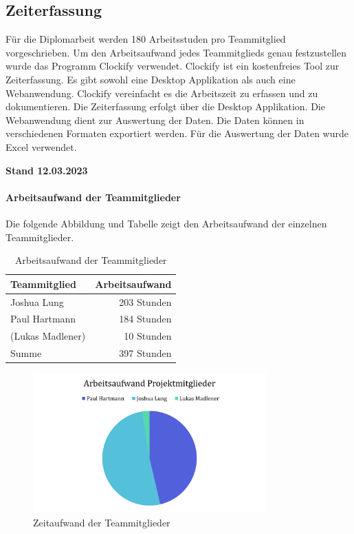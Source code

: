 \subsection{Zeiterfassung}
Für die Diplomarbeit werden 180 Arbeitsstuden pro Teammitglied vorgeschrieben. Um den Arbeitsaufwand jedes Teammitglieds genau festzustellen wurde das Programm Clockify verwendet. Clockify ist ein kostenfreies Tool zur Zeiterfassung. Es gibt sowohl eine Desktop Applikation als auch eine Webanwendung. Clockify vereinfacht es die Arbeitszeit zu erfassen und zu dokumentieren. Die Zeiterfassung erfolgt über die Desktop Applikation. Die Webanwendung dient zur Auswertung der Daten. Die Daten können in verschiedenen Formaten exportiert werden. Für die Auswertung der Daten wurde Excel verwendet.

\textbf{Stand 12.03.2023}

\paragraph{Arbeitsaufwand der Teammitglieder}
Die folgende Abbildung und Tabelle zeigt den Arbeitsaufwand der einzelnen Teammitglieder.

\begin{table}[H]
  \centering
  \begin{tabular}{lr}
    \toprule
    \textbf{Teammitglied} & \textbf{Arbeitsaufwand} \\
    \midrule
    Joshua Lung           & 203 Stunden             \\
    Paul Hartmann         & 184 Stunden             \\
    (Lukas Madlener)      & 10 Stunden              \\
    \midrule
    Summe                 & 397 Stunden             \\
    \bottomrule
  \end{tabular}
  \caption{Arbeitsaufwand der Teammitglieder}
  \label{tab:zeiterfassung_teammitglieder}
\end{table}

\begin{figure}[H]
  \centering
  \includegraphics[width=0.8\textwidth]{images/zeiterfassung_teammitglieder.png}
  \caption{Zeitaufwand der Teammitglieder}
  \label{fig:zeiterfassung_teammitglieder}
\end{figure}


